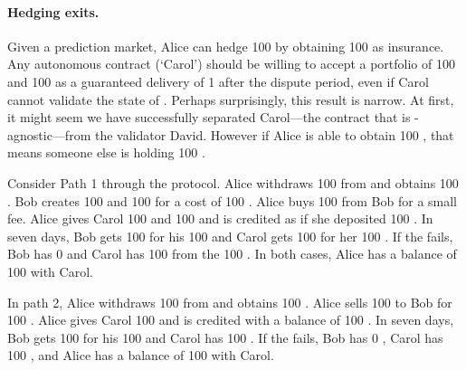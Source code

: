 \paragraph{Hedging exits.} Given a prediction market, Alice can hedge 100 \ethxx by obtaining 100 \fail as insurance. Any autonomous \layerone contract (`Carol') should be willing to accept a portfolio of 100 \ethxx and 100 \fail as a guaranteed delivery of 1 \ethone after the dispute period, even if Carol cannot validate the state of \layertwo.  Perhaps surprisingly, this result is narrow. At first, it might seem we have successfully separated Carol---the \layerone contract that is \layertwo-agnostic---from the \layertwo validator David. However if Alice is able to obtain 100 \fail, that means someone else is holding 100 \final. 



Consider Path 1 through the protocol. Alice withdraws 100 \ethtwo from \layertwo and obtains 100 \ethxx. Bob creates 100 \fail and 100 \final for a cost of 100 \ethone. Alice buys 100 \fail from Bob for a small fee. Alice gives Carol 100 \ethxx and 100 \fail and is credited as if she deposited 100 \ethone. In seven days, Bob gets 100 \ethone for his 100 \final and Carol gets 100 \ethone for her 100 \ethxx. If the \rblock fails, Bob has 0 \ethone and Carol has 100 \ethone from the 100 \fail. In both cases, Alice has a balance of 100 \ethone with Carol. 

In path 2, Alice withdraws 100 \ethtwo from \layertwo and obtains 100 \ethxx. Alice sells 100 \ethxx to Bob for 100 \ethone. Alice gives Carol 100 \ethone and is credited with a balance of 100 \ethone. In seven days, Bob gets 100 \ethone for his 100 \ethxx and Carol has 100 \ethone. If the \rblock fails, Bob has 0 \ethone, Carol has 100 \ethone, and Alice has a balance of 100 \ethone with Carol.

